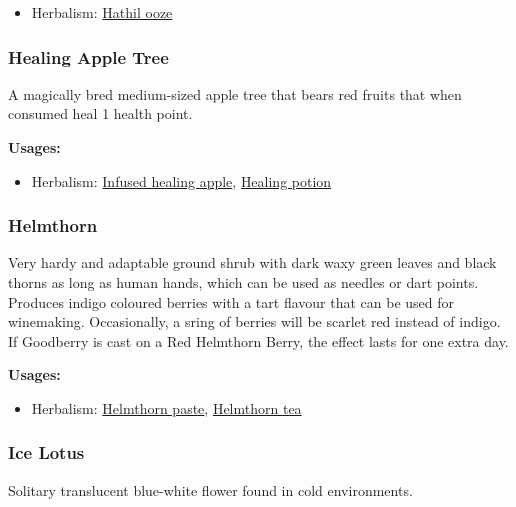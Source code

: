 \begin{itemize}[noitemsep]
\item[] Herbalism: \hyperref[Hathil ooze]{Hathil ooze}
\end{itemize}

\subsubsection{Healing Apple Tree}
\label{Healing Apple Tree}

A magically bred medium-sized apple tree that bears red fruits that when consumed heal 1 health point.

\vspace{5mm}

\textbf{Usages:}

\begin{itemize}[noitemsep]
\item[] Herbalism: \hyperref[Infused healing apple]{Infused healing apple}, \hyperref[healing_potion]{Healing potion}
\end{itemize}

\subsubsection{Helmthorn}
\label{Helmthorn}

Very hardy and adaptable ground shrub with dark waxy green leaves and black thorns as long as human hands, which can be used as needles or dart points. Produces indigo coloured berries with a tart flavour that can be used for winemaking. Occasionally, a sring of berries will be scarlet red instead of indigo. If Goodberry is cast on a Red Helmthorn Berry, the effect lasts for one extra day.

\vspace{5mm}

\textbf{Usages:}

\begin{itemize}[noitemsep]
\item[] Herbalism: \hyperref[Helmthorn paste]{Helmthorn paste}, \hyperref[Helmthorn tea]{Helmthorn tea}
\end{itemize}

\subsubsection{Ice Lotus}
\label{Ice Lotus}

Solitary translucent blue-white flower found in cold environments.

